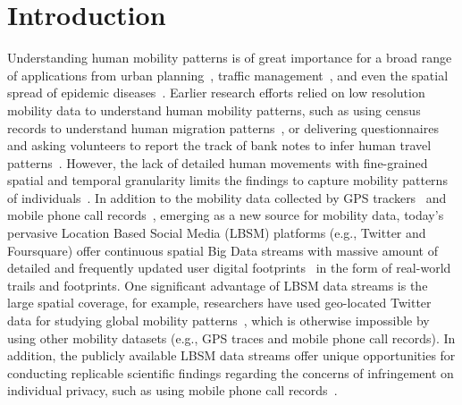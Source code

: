 \documentclass[a4paper, 11pt]{article}
\begin{document}
\section{Introduction}
Understanding human mobility patterns is of great importance for a broad range of applications from urban planning~\citep{zheng2008understanding}, traffic management~\citep{jiang2009characterizing}, and even the spatial spread of epidemic diseases~\citep{belik2011natural}.
Earlier research efforts relied on low resolution mobility data to understand human mobility patterns, such as using census records to understand human migration patterns~\citep{greenwood1985human}, or delivering questionnaires and asking volunteers to report the track of bank notes to infer human travel patterns~\citep{brockmann2006scaling}.
However, the lack of detailed human movements with fine-grained spatial and temporal granularity limits the findings to capture mobility patterns of individuals~\citep{gonzalez2008understanding,Jurdak2015}.
In addition to the mobility data collected by GPS trackers~\citep{zheng2008understanding, rhee2011levy} and mobile phone call records~\citep{gonzalez2008understanding,sevtsuk2010does,kung2014exploring}, 
emerging as a new source for mobility data, today's pervasive Location Based Social Media (LBSM) platforms (e.g., Twitter and Foursquare) offer continuous spatial Big Data streams with massive amount of detailed and frequently updated user digital footprints~\citep{thatcher2014living} in the form of real-world trails and footprints.
One significant advantage of LBSM data streams is the large spatial coverage, for example, researchers have used geo-located Twitter data for studying global mobility patterns~\citep{hawelka2014geo}, which is otherwise impossible by using other mobility datasets (e.g., GPS traces and mobile phone call records). 
In addition, the publicly available LBSM data streams offer unique opportunities for conducting replicable scientific findings regarding the concerns of infringement on individual privacy, such as using mobile phone call records~\citep{giannotti2008mobility,crampton2014collect,Jurdak2015}.
\end{document}
